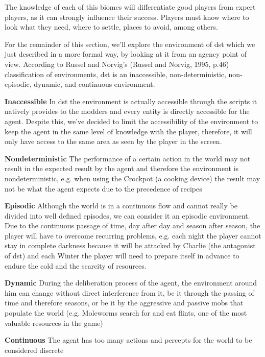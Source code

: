 The knowledge of each of this biomes will differentiate good players from expert players, as it can strongly influence their success.
Players must know where to look what they need, where to settle, places to avoid, among others.

For the remainder of this section, we'll explore the environment of \gls{dst} which we just described in a more formal way, by looking at it from an agency point of view.
According to Russel and Norvig's (Russel and Norvig, 1995, p.46) classification of environments, \gls{dst} is an inaccessible, non-deterministic, non-episodic, dynamic, and continuous environment.

\begin{description}
	\item \textbf{Inaccessible} In \gls{dst} the environment is actually accessible through the scripts it natively provides to the modders and every entity is directly accessible for the agent. Despite this, we've decided to limit the accessibility of the environment to keep the agent in the same level of knowledge with the player, therefore, it will only have access to the same area as seen by the player in the screen.
	\item \textbf{Nondeterministic} The performance of a certain action in the world may not result in the expected result by the agent and therefore the environment is nondeterministic, e.g. when using the Crockpot (a cooking device) the result may not be what the agent expects due to the precedence of recipes
	\item \textbf{Episodic} Although the world is in a continuous flow and cannot really be divided into well defined episodes, we can consider it an episodic environment. 
	Due to the continuous passage of time, day after day and season after season, the player will have to overcome recurring problems, e.g. each night the player cannot stay in complete darkness because it will be attacked by Charlie (the antagonist of \gls{dst}) and each Winter the player will need to prepare itself in advance to endure the cold and the scarcity of resources.
	\item \textbf{Dynamic} During the deliberation process of the agent, the environment around him can change without direct interference from it, be it through the passing of time and therefore seasons, or be it by the aggressive and passive mobs that populate the world (e.g. Moleworms search for and eat flints, one of the most valuable resources in the game)
	\item \textbf{Continuous} The agent has too many actions and percepts for the world to be considered discrete
\end{description}

